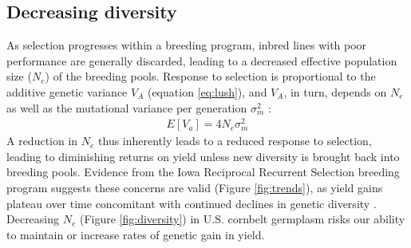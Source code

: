 \documentclass[final,12pt]{article}
\begin{document}

\subsection*{Decreasing diversity} 

As selection progresses within a breeding program, inbred lines with poor performance are generally discarded, leading to a decreased effective population size ($N_e$) of the breeding pools.
Response to selection is proportional to the additive genetic variance $V_A$ (equation \ref{eq:lush}), and $V_A$, in turn, depends on $N_e$ as well as the mutational variance per generation ${\sigma}_m^2$ \citep{whitlock1999neutral}:
\begin{align*}
E[V_a] = 4N_e {\sigma}_m^2
\label{eq:whitlock}
\end{align*}
A reduction in $N_e$ thus inherently leads to a reduced response to  selection, leading to diminishing returns on yield unless new diversity is brought back into breeding pools.
Evidence from the Iowa Reciprocal Recurrent Selection breeding program suggests these concerns are valid (Figure \ref{fig:trends}), as yield gains plateau over time \citep{rouse2003selection} concomitant with continued declines in genetic diversity \citep{Gerke:2013tw}.
Decreasing $N_e$ (Figure \ref{fig:diversity}) in U.S. cornbelt germplasm risks our ability to maintain or increase rates of genetic gain in yield.

\end{document}
